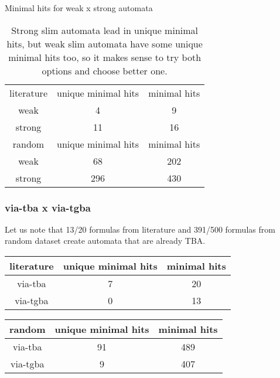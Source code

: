 \documentclass[
	digital
nolof, nolot
]{fithesis3}
\begin{document}
		{Minimal hits for weak x strong automata}
		\begin{table}[ht]
			\centering
			\caption{Strong slim automata lead in unique minimal hits, but weak slim automata have some unique minimal hits too, so it makes sense to try both options and choose better one. }
			\begin{tabular}{ |c||c|c| } 
				\hline
				literature&unique minimal hits&minimal hits\\
				\hhline{|===|}
				weak&4 & 9\\
				\hline
				strong&11 & 16\\ 
				\hline
				\hline
				random&unique minimal hits&minimal hits\\
				\hhline{|===|}
				weak&68 & 202\\
				\hline
				strong&296 & 430\\ 
				\hline
			\end{tabular}
		\end{table}

		\clearpage
		\subsubsection{via-tba x via-tgba}
		\begin{table}[ht]
		\caption{scatter plot via-tba x via-tgba, equal values excluded}
		\begin{tikzpicture}
			
		\end{tikzpicture}
	\end{table}
		
		 
		\begin{table}[ht]
			Let us note that 13/20 formulas from literature and 391/500 formulas from random dataset create automata that are already TBA.
			\begin{tabular}{ |c|c|c| } 
				\hline
				literature&unique minimal hits&minimal hits\\
				\hline
				via-tba&7 & 20\\
				\hline
				via-tgba&0 & 13\\ 
				\hline
			\end{tabular}
		\end{table}
		\begin{table}[ht]
			\begin{tabular}{ |c|c|c| } 
				\hline
				random&unique minimal hits&minimal hits\\
				\hline
				via-tba&91 & 489\\
				\hline
				via-tgba&9 & 407\\ 
				\hline
			\end{tabular}
		\end{table}
		\clearpage
\end{document}
